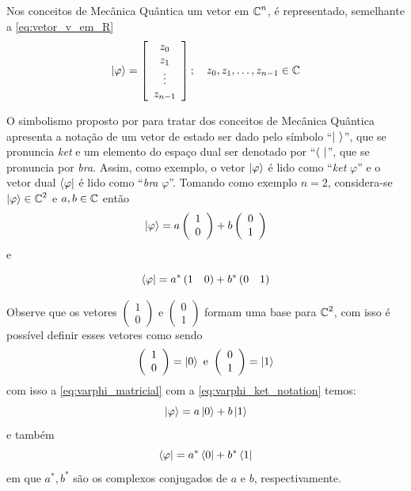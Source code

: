 Nos conceitos de Mecânica Quântica um vetor em $\operatorname{\mathbb{C}}^n$, é representado, semelhante a \autoref{eq:vetor_v_em_R}
$$
    \label{eq:vetor_em_C}
    \ket{\varphi} = \left[\begin{array}{c}
         z_0 \\
         z_1 \\
         \vdots \\
         z_{n-1}
    \end{array}\right];\quad z_0,z_1,\ldots, z_{n-1}\in\operatorname{\mathbb{C}}
$$

O simbolismo proposto por \textcite{dirac1981principles} para tratar dos conceitos de Mecânica Quântica apresenta a notação de um vetor de estado ser dado pelo símbolo ``$\ket{\ }$'', que se pronuncia \textit{ket} e um elemento do espaço dual ser denotado por ``$\bra{\ }$'', que se pronuncia por \textit{bra}. Assim, como exemplo, o vetor $\ket{\varphi}$ é lido como ``\textit{ket} $\varphi$'' e o vetor dual $\bra{\varphi}$ é lido como ``\textit{bra} $\varphi$''. Tomando como exemplo $n=2$, considera-se $\ket{\varphi}\in\operatorname{\mathbb{C}}^2$ e $a,b\in\operatorname{\mathbb{C}}$ então
\begin{equation}\label{eq:varphi_matricial}
    \ket{\varphi}=a\left(\begin{array}{c}
         1 \\ 
         0
    \end{array}\right)+b\left(\begin{array}{c}
         0 \\
         1
    \end{array}\right)
\end{equation}
\noindent e 

\begin{equation}\label{eq:bra_varphi_matricial}
\bra{\varphi}=a^*\left(1\quad 0\right) + b^*\left(0\quad 1\right)
\end{equation}

Observe que os vetores $\left(\begin{array}{c}
         1 \\ 
         0
    \end{array}\right)$ e $\left(\begin{array}{c}
         0 \\
         1
    \end{array}\right)$ formam uma base para $\operatorname{\mathbb{C}}^2$, com isso é possível definir esses vetores como sendo
\begin{equation}\label{eq:varphi_ket_notation}
\left(\begin{array}{c}
     1 \\
     0
\end{array}\right)=\ket{0}\text{ e }\left(\begin{array}{c}
     0 \\
     1
\end{array}\right)=\ket{1}
\end{equation}
com isso a \autoref{eq:varphi_matricial} com a \autoref{eq:varphi_ket_notation} temos:
$$\ket{\varphi}=a\ket{0}+b\ket{1}$$
\noindent e também 
$$\bra{\varphi}=a^*\bra{0}+b^*\bra{1}$$
\noindent em que $a^*, b^*$ são os complexos conjugados de $a$ e $b$, respectivamente.

